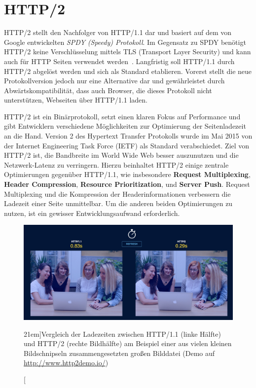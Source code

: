 \documentclass[a4paper, justified, notoc]{tufte-handout} %
\begin{document}
\section{HTTP/2} %
\label{sec:http_2}
HTTP/2 stellt den Nachfolger von HTTP/1.1 dar und basiert auf dem von Google entwickelten \emph{SPDY (Speedy) Protokoll}. Im Gegensatz zu SPDY benötigt HTTP/2 keine Verschlüsselung mittels TLS (Transport Layer Security) und kann auch für HTTP Seiten verwendet werden~\citep{mueller:2015}. Langfristig soll HTTP/1.1 durch HTTP/2 abgelöst werden und sich als Standard etablieren. Vorerst stellt die neue Protokollversion jedoch nur eine Alternative dar und gewährleistet durch Abwärtskompatibilität, dass auch Browser, die dieses Protokoll nicht unterstützen, Webseiten über HTTP/1.1 laden.

HTTP/2 ist ein Binärprotokoll, setzt einen klaren Fokus auf Performance und gibt Entwicklern verschiedene Möglichkeiten zur Optimierung der Seitenladezeit an die Hand. 
Version 2 des Hypertext Transfer Protokolls wurde im Mai 2015 von der Internet Engineering Task Force (IETF) als Standard verabschiedet. 
Ziel von HTTP/2 ist, die Bandbreite im World Wide Web besser auszunutzen und die Netzwerk-Latenz zu verringern. Hierzu beinhaltet HTTP/2 einige zentrale Optimierungen gegenüber HTTP/1.1, wie insbesondere \textbf{Request Multiplexing}, \textbf{Header Compression}, \textbf{Resource Prioritization}, und \textbf{Server Push}.
Request Multiplexing und die Kompression der Headerinformationen verbessern die Ladezeit einer Seite unmittelbar. Um die anderen beiden Optimierungen zu nutzen, ist ein gewisser Entwicklungsaufwand erforderlich.

\begin{figure}%
	\centering
  \includegraphics[width=1.5\textwidth]{./figures/http2_demo_people.png}
  \caption[][21em]{Vergleich der Ladezeiten zwischen HTTP/1.1 (linke Hälfte) und HTTP/2 (rechte Bildhälfte) am Beispiel einer aus vielen kleinen Bildschnipseln zusammengesetzten großen Bilddatei (Demo auf \url{http://www.http2demo.io/})}
  \label{fig:http2_demo_1}
\end{figure}
\end{document}
